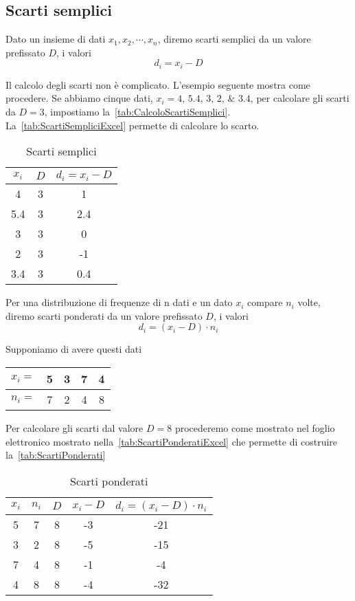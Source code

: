 \subsection{Scarti semplici}
\begin{defn}
Dato un insieme di dati  $x_{1},x_{2},\cdots,x_{n}$, diremo scarti semplici da un valore prefissato $D$,  i valori \[d_{i}=x_{i}-D \]
\end{defn}
Il calcolo degli scarti non è complicato. L'esempio seguente mostra come procedere. Se abbiamo cinque dati, $x_{i}=\numlist{4;5.4;3;2;3.4}$, per calcolare gli scarti da $D=3$, impostiamo  la~\vref{tab:CalcoloScartiSemplici}. La~\vref{tab:ScartiSempliciExcel} permette di calcolare lo scarto. 
\begin{table}
	\centering
	\begin{tabular}{S[table-format=1.1]S[table-format=1.0]S[table-format=1.1]}
		\toprule
		{$x_{i}$}& {$D$} &{$d_{i}=x_{i}-D$}  \\ 
		&  3& 1 \\ 
		5.4& 3 &2.4  \\ 
		3&  3& 0 \\ 
		2&  3& -1 \\ 
		3.4&3 &0.4\\
		\bottomrule
	\end{tabular} 
	\caption{Scarti semplici}
	\label{tab:CalcoloScartiSemplici}
\end{table}
\begin{defn}
Per una distribuzione di frequenze di n dati e un dato $x_{i}$ compare $n_{i}$ volte,  diremo scarti ponderati da un valore prefissato $D$,  i valori \[d_{i}=(x_{i}-D)\cdot n_{i} \]
\end{defn}
Supponiamo di avere questi dati 
\begin{center}
	\begin{tabular}{l*{4} {S[table-format=1.0]}}
		{$x_{i}=$}	&5  &3  &7  &4  \\
		\midrule 
		{$n_{i}=$}	& 7 &2  & 4 & 8 \\ 
	\end{tabular}
\end{center}
Per calcolare gli  scarti dal valore $D=8$  procederemo come mostrato nel foglio elettronico mostrato nella~\vref*{tab:ScartiPonderatiExcel} che permette di costruire la~\vref{tab:ScartiPonderati}
\begin{table}
	\centering
	\begin{tabular}{*{4} {S[table-format=1.0]}S[table-format=2.0]}
		\toprule
		{$x_{i}$} & {$n_{i}$ } & {$D$} & {$x_{i}-D $} & {$d_{i}=(x_{i}-D ) \cdot n_{i}$} \\ 
		& 7 &8  & -3 & -21 \\ 
		3&  2& 8 &  -5& -15 \\ 
		7&  4& 8 &  -1&  -4\\ 
		4&  8& 8 & -4 & -32 \\ 
		\bottomrule
	\end{tabular} 
	\caption{Scarti ponderati}
	\label{tab:ScartiPonderati}
\end{table}

